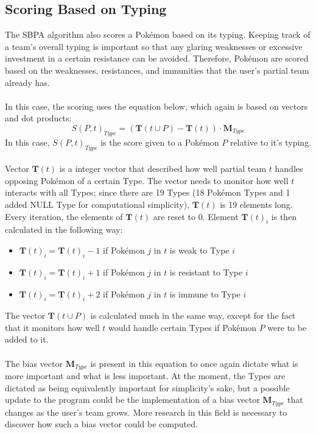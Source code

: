 \documentclass{article}
\begin{document}
\subsection{Scoring Based on Typing}
The SBPA algorithm also scores a Pok\'emon based on its typing. Keeping track of a team's overall typing is important so that any glaring weaknesses or excessive investment in a certain resistance can be avoided. Therefore, Pok\'emon are scored based on the weaknesses, resistances, and immunities that the user's partial team already has.\\\\
In this case, the scoring uses the equation below, which again is based on vectors and dot products:
\begin{equation}\label{TypeScoreEqn}
	S(P,t)_{Type}=(\textbf{T}(t\cup P)-\textbf{T}(t))\cdot\textbf{M}_{Type}
\end{equation}
In this case, $S(P,t)_{Type}$ is the score given to a Pok\'emon $P$ relative to it's typing.\\\\
Vector $\textbf{T}(t)$ is a integer vector that described how well partial team $t$ handles opposing Pok\'emon of a certain Type. The vector needs to monitor how well $t$ interacts with all Types; since there are 19 Types (18 Pok\'emon Types and 1 added NULL Type for computational simplicity), $\textbf{T}(t)$ is 19 elements long. Every iteration, the elements of $\textbf{T}(t)$ are reset to 0. Element $\textbf{T}(t)_i$ is then calculated in the following way:
\begin{itemize}
	\item $\textbf{T}(t)_i=\textbf{T}(t)_i-1$ if Pok\'emon $j$ in $t$ is weak to Type $i$
	\item $\textbf{T}(t)_i=\textbf{T}(t)_i+1$ if Pok\'emon $j$ in $t$ is resistant to Type $i$
	\item $\textbf{T}(t)_i=\textbf{T}(t)_i+2$ if Pok\'emon $j$ in $t$ is immune to Type $i$
\end{itemize}
The vector $\textbf{T}(t\cup P)$ is calculated much in the same way, except for the fact that it monitors how well $t$ would handle certain Types if Pok\'emon $P$ were to be added to it.\\\\
The bias vector $\textbf{M}_{Type}$ is present in this equation to once again dictate what is more important and what is less important. At the moment, the Types are dictated as being equivalently important for simplicity's sake, but a possible update to the program could be the implementation of a bias vector $\textbf{M}_{Type}$ that changes as the user's team grows. More research in this field is necessary to discover how such a bias vector could be computed.\\\\
\end{document}
